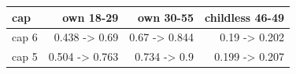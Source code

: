 \begin{tabular}{lrrr}
\toprule
cap & own 18-29 & own 30-55 & childless 46-49 \\
\midrule
cap 6 & 0.438 -> 0.69 & 0.67 -> 0.844 & 0.19 -> 0.202 \\
cap 5 & 0.504 -> 0.763 & 0.734 -> 0.9 & 0.199 -> 0.207 \\
\bottomrule
\end{tabular}
